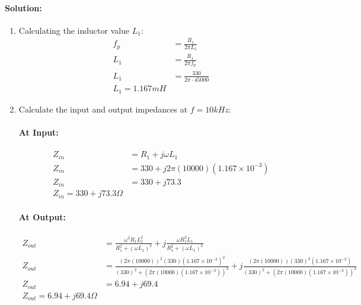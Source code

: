 \paragraph{Solution:}
\begin{enumerate}
  \item Calculating the inductor value \(L_1\):
    \begin{align*}
      f_p &= \frac{R_1}{2 \pi L_1} \\
      L_1 &= \frac{R_1}{2 \pi f_p} \\
      L_1 &= \frac{330}{2 \pi \cdot 45000} \\
      \boxed{L_1 = 1.167 mH}
    \end{align*}
  \item Calculate the input and output impedances at
    \(f = 10kHz\):
    \paragraph{At Input:}
      \begin{align*}
        Z_{in} &= R_1 + j \omega L_1 \\
        Z_{in} &= 330 + j 2 \pi (10000) (1.167 \times 10^{-3}) \\
        Z_{in} &= 330 + j 73.3 \\
        \boxed{Z_{in} = 330 + j 73.3 \Omega}
      \end{align*}
    \paragraph{At Output:}
      \begin{align*}
        Z_{out} &= \frac{\omega^2 R_1 L_1^2}{R_1^2 + (\omega L_1)^2} + j \frac{\omega R_1^2 L_1}{R_1^2 + (\omega L_1)^2} \\
        Z_{out} &= \frac{(2 \pi (10000))^2 (330) (1.167 \times 10^{-3})^2}{(330)^2 + (2 \pi (10000) (1.167 \times 10^{-3}))^2} + j \frac{(2 \pi (10000)) (330)^2 (1.167 \times 10^{-3})}{(330)^2 + (2 \pi (10000) (1.167 \times 10^{-3}))^2} \\
        Z_{out} &= 6.94 + j 69.4 \\
        \boxed{Z_{out} = 6.94 + j 69.4 \Omega}
      \end{align*}
  \end{enumerate}
